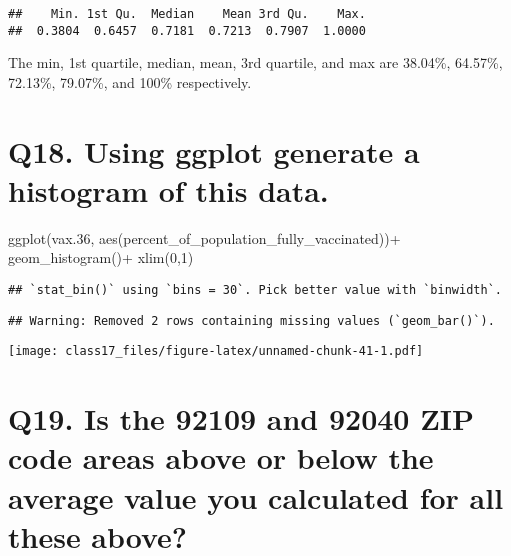 \documentclass[
]{article}
\newenvironment{Shaded}{\begin{snugshade}}{\end{snugshade}}
\newcommand{\DecValTok}[1]{\textcolor[rgb]{0.00,0.00,0.81}{#1}}
\newcommand{\FloatTok}[1]{\textcolor[rgb]{0.00,0.00,0.81}{#1}}
\newcommand{\FunctionTok}[1]{\textcolor[rgb]{0.00,0.00,0.00}{#1}}
\newcommand{\NormalTok}[1]{#1}
\newcommand{\OtherTok}[1]{\textcolor[rgb]{0.56,0.35,0.01}{#1}}
\newcommand{\SpecialCharTok}[1]{\textcolor[rgb]{0.00,0.00,0.00}{#1}}
\newcommand{\StringTok}[1]{\textcolor[rgb]{0.31,0.60,0.02}{#1}}
\begin{document}
\begin{verbatim}
##    Min. 1st Qu.  Median    Mean 3rd Qu.    Max. 
##  0.3804  0.6457  0.7181  0.7213  0.7907  1.0000
\end{verbatim}

The min, 1st quartile, median, mean, 3rd quartile, and max are 38.04\%,
64.57\%, 72.13\%, 79.07\%, and 100\% respectively.

\hypertarget{q18.-using-ggplot-generate-a-histogram-of-this-data.}{%
\section{Q18. Using ggplot generate a histogram of this
data.}\label{q18.-using-ggplot-generate-a-histogram-of-this-data.}}

\begin{Shaded}
\begin{Highlighting}[]
\FunctionTok{ggplot}\NormalTok{(vax}\FloatTok{.36}\NormalTok{,}
       \FunctionTok{aes}\NormalTok{(percent\_of\_population\_fully\_vaccinated))}\SpecialCharTok{+}
  \FunctionTok{geom\_histogram}\NormalTok{()}\SpecialCharTok{+}
  \FunctionTok{xlim}\NormalTok{(}\DecValTok{0}\NormalTok{,}\DecValTok{1}\NormalTok{)}
\end{Highlighting}
\end{Shaded}

\begin{verbatim}
## `stat_bin()` using `bins = 30`. Pick better value with `binwidth`.
\end{verbatim}

\begin{verbatim}
## Warning: Removed 2 rows containing missing values (`geom_bar()`).
\end{verbatim}

\texttt{[image: class17\_files/figure-latex/unnamed-chunk-41-1.pdf]}

\hypertarget{q19.-is-the-92109-and-92040-zip-code-areas-above-or-below-the-average-value-you-calculated-for-all-these-above}{%
\section{Q19. Is the 92109 and 92040 ZIP code areas above or below the
average value you calculated for all these
above?}\label{q19.-is-the-92109-and-92040-zip-code-areas-above-or-below-the-average-value-you-calculated-for-all-these-above}}

\begin{Shaded}
\end{Shaded}
\end{document}
